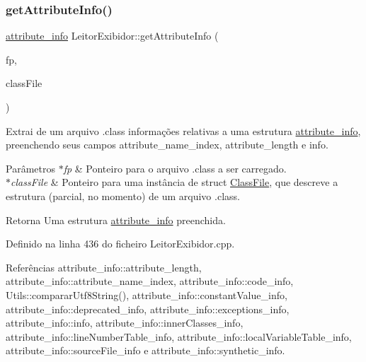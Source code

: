 \mbox{\label{classLeitorExibidor_a81a7c01ab5ad3fb4fb1bb524d85ee5c0}} 
\subsubsection{\texorpdfstring{get\+Attribute\+Info()}{getAttributeInfo()}}
{\footnotesize\ttfamily \hyperlink{structattribute__info}{attribute\+\_\+info} Leitor\+Exibidor\+::get\+Attribute\+Info (\begin{DoxyParamCaption}\item[{F\+I\+LE $\ast$}]{fp,  }\item[{\hyperlink{classClassFile}{Class\+File} $\ast$}]{class\+File }\end{DoxyParamCaption})\hspace{0.3cm}{\ttfamily [private]}}

Extrai de um arquivo .class informações relativas a uma estrutura \hyperlink{structattribute__info}{attribute\+\_\+info}, preenchendo seus campos attribute\+\_\+name\+\_\+index, attribute\+\_\+length e info. 
\begin{DoxyParams}{Parâmetros}
{\em $\ast$fp} & Ponteiro para o arquivo .class a ser carregado. \\
\hline
{\em $\ast$class\+File} & Ponteiro para uma instância de struct \hyperlink{classClassFile}{Class\+File}, que descreve a estrutura (parcial, no momento) de um arquivo .class. \\
\hline
\end{DoxyParams}
\begin{DoxyReturn}{Retorna}
Uma estrutura \hyperlink{structattribute__info}{attribute\+\_\+info} preenchida. 
\end{DoxyReturn}


Definido na linha 436 do ficheiro Leitor\+Exibidor.\+cpp.



Referências attribute\+\_\+info\+::attribute\+\_\+length, attribute\+\_\+info\+::attribute\+\_\+name\+\_\+index, attribute\+\_\+info\+::code\+\_\+info, Utils\+::comparar\+Utf8\+String(), attribute\+\_\+info\+::constant\+Value\+\_\+info, attribute\+\_\+info\+::deprecated\+\_\+info, attribute\+\_\+info\+::exceptions\+\_\+info, attribute\+\_\+info\+::info, attribute\+\_\+info\+::inner\+Classes\+\_\+info, attribute\+\_\+info\+::line\+Number\+Table\+\_\+info, attribute\+\_\+info\+::local\+Variable\+Table\+\_\+info, attribute\+\_\+info\+::source\+File\+\_\+info e attribute\+\_\+info\+::synthetic\+\_\+info.

